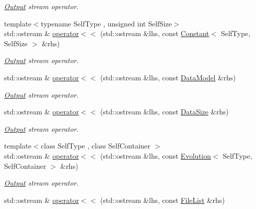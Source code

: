 \begin{DoxyCompactItemize}
\begin{DoxyCompactList}\small\item\em \hyperlink{exceptionOutput}{Output} stream operator. \end{DoxyCompactList}\item 
{\footnotesize template$<$typename Self\-Type , unsigned int Self\-Size$>$ }\\std\-::ostream \& \hyperlink{namespacemagrathea_ad8f44f282dd621e72f37ef2284bab7c8}{operator$<$$<$} (std\-::ostream \&lhs, const \hyperlink{exceptionmagrathea_1_1Constant}{Constant}$<$ Self\-Type, Self\-Size $>$ \&rhs)
\begin{DoxyCompactList}\small\item\em \hyperlink{exceptionOutput}{Output} stream operator. \end{DoxyCompactList}\item 
std\-::ostream \& \hyperlink{namespacemagrathea_a7589507913b63d5bf438e636ea48d3b8}{operator$<$$<$} (std\-::ostream \&lhs, const \hyperlink{exceptionmagrathea_1_1DataModel}{Data\-Model} \&rhs)
\begin{DoxyCompactList}\small\item\em \hyperlink{exceptionOutput}{Output} stream operator. \end{DoxyCompactList}\item 
std\-::ostream \& \hyperlink{namespacemagrathea_afb66b9e9208594fe09e39845df8c0f73}{operator$<$$<$} (std\-::ostream \&lhs, const \hyperlink{exceptionmagrathea_1_1DataSize}{Data\-Size} \&rhs)
\begin{DoxyCompactList}\small\item\em \hyperlink{exceptionOutput}{Output} stream operator. \end{DoxyCompactList}\item 
{\footnotesize template$<$class Self\-Type , class Self\-Container $>$ }\\std\-::ostream \& \hyperlink{namespacemagrathea_a0290637ad3695043958a42c80bd79519}{operator$<$$<$} (std\-::ostream \&lhs, const \hyperlink{exceptionmagrathea_1_1Evolution}{Evolution}$<$ Self\-Type, Self\-Container $>$ \&rhs)
\begin{DoxyCompactList}\small\item\em \hyperlink{exceptionOutput}{Output} stream operator. \end{DoxyCompactList}\item 
std\-::ostream \& \hyperlink{namespacemagrathea_a679190b0b2facf29e17c19f9b2133f96}{operator$<$$<$} (std\-::ostream \&lhs, const \hyperlink{exceptionmagrathea_1_1FileList}{File\-List} \&rhs)

\end{DoxyCompactItemize}
